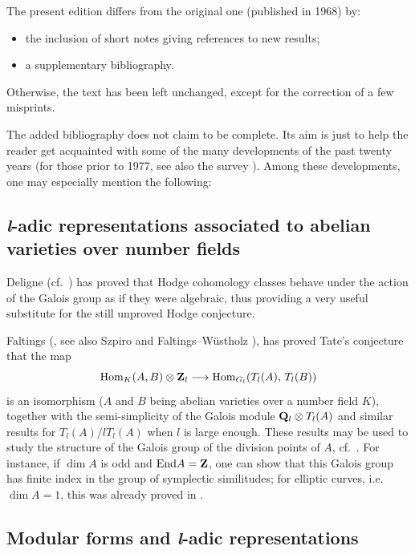 
\begingroup\small
The present edition differs from the original one (published in 1968) by:
\begin{itemize}
\item the inclusion of short notes giving references to new results;
\item a supplementary bibliography.
\end{itemize}
Otherwise, the text has been left unchanged, except for the correction of a
few misprints.

The added bibliography does not claim to be complete. Its aim is just to
help the reader get acquainted with some of the many developments of the
past twenty years (for those prior to 1977, see also the survey
\cite{serre-kyoto}). Among these developments, one may especially mention
the following:

\subsection*{\normalfont\bfseries \textit{l}-adic representations associated to abelian varieties over number fields}

Deligne (cf.~\cite{deligne-hodge}) has proved that Hodge cohomology
classes behave under the action of the Galois group as if they were
algebraic, thus providing a very useful substitute for the still unproved
Hodge conjecture.

Faltings (\cite{faltings-endl}, see also Szpiro \cite{szpiro} and
Faltings--Wüstholz \cite{faltings-wustholz}), has proved Tate's conjecture
that the map
\[
\mathrm{Hom}_K(A,B)\mathbin{\otimes}\mathbf{Z}_l \longrightarrow \mathrm{Hom}_{G_l}(T_l(A),\,T_l(B))
\]
is an isomorphism ($A$ and $B$ being abelian varieties over a number field
$K$), together with the semi-simplicity of the Galois module
$\mathbf{Q}_l\mathbin{\otimes} T_l(A)$ and similar results for $T_l(A)/lT_l(A)$ when $l$ is
large enough. These results may be used to study the structure of the
Galois group of the division points of $A$, cf.~\cite{serre-resume85}. For
instance, if $\dim A$ is odd and $\mathrm{End} A=\mathbf{Z}$, one can show that this
Galois group has finite index in the group of symplectic similitudes; for
elliptic curves, i.e. $\dim A=1$, this was already proved in
\cite{serre-proprietes}.

\subsection*{\normalfont\bfseries Modular forms and \textit{l}-adic representations}

